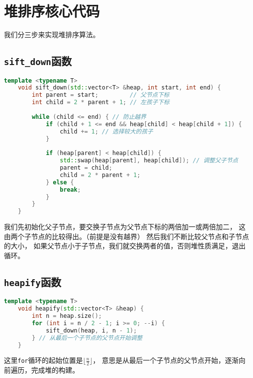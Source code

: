 \documentclass[UTF8]{ctexart}
\begin{document}
\pagestyle{fancy}
\fancyhead{}

\section{堆排序核心代码}

我们分三步来实现堆排序算法。

\subsection{\texttt{sift\_down}函数}

\begin{lstlisting}[language=C++]
    template <typename T> 
    void sift_down(std::vector<T> &heap, int start, int end) {
        int parent = start;         // 父节点下标
        int child = 2 * parent + 1; // 左孩子下标
    
        while (child <= end) { // 防止越界
            if (child + 1 <= end && heap[child] < heap[child + 1]) {
                child += 1; // 选择较大的孩子
            }
    
            if (heap[parent] < heap[child]) {
                std::swap(heap[parent], heap[child]); // 调整父子节点
                parent = child;
                child = 2 * parent + 1;
            } else {
                break;
            }
        }
    }
\end{lstlisting}

我们先初始化父子节点，要交换子节点为父节点下标的两倍加一或两倍加二，
这由两个子节点的比较得出。（前提是没有越界）
然后我们不断比较父节点和子节点的大小，
如果父节点小于子节点，我们就交换两者的值，否则堆性质满足，退出循环。

\subsection{\texttt{heapify}函数}

\begin{lstlisting}[language=C++]
    template <typename T> 
    void heapify(std::vector<T> &heap) {
        int n = heap.size();
        for (int i = n / 2 - 1; i >= 0; --i) {
            sift_down(heap, i, n - 1);
        } // 从最后一个子节点的父节点开始调整
    }
\end{lstlisting}

这里\texttt{for}循环的起始位置是$\lfloor \frac{n}{2} \rfloor$，
意思是从最后一个子节点的父节点开始，逐渐向前遍历，完成堆的构建。
\end{document}
